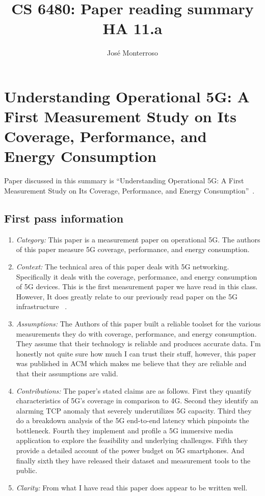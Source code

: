\documentclass[letterpaper,twocolumn,10pt]{article}
\title{CS 6480: Paper reading summary\\
HA 11.a\\}
\author{José Monterroso}
\affil{School of Computing, University of Utah}
\begin{document}
\maketitle
\section{Understanding Operational 5G: A First Measurement Study on Its Coverage, Performance, and Energy Consumption}

Paper discussed in this summary is ``Understanding Operational 5G: A First Measurement Study on Its Coverage, Performance, and Energy Consumption''~\cite{measurementstudy}.

\subsection{First pass information}
\label{sec:first}

\begin{enumerate}

\item {\it Category:} 
This paper is a measurement paper on operational 5G. The authors of this paper measure 5G coverage, 
performance, and energy consumption. 

\item {\it Context:} 
The technical area of this paper deals with 5G networking. Specifically it deals with the coverage, performance,
and energy consumption of 5G devices. This is the first measurement paper we have read in this class. However,
It does greatly relate to our previously read paper on the 5G infrastructure ~\cite{5gwhite}.

\item {\it Assumptions:}  
The Authors of this paper built a reliable toolset for the various measurements they do with coverage, performance,
and energy consumption. They assume that their technology is reliable and produces accurate data. I'm honestly 
not quite sure how much I can trust their stuff, however, this paper was published in ACM which makes me believe
that they are reliable and that their assumptions are valid. 

\item {\it Contributions:} 
The paper's stated claims are as follows. First they quantify characteristics of 5G's coverage in comparison to 4G.
Second they identify an alarming TCP anomaly that severely underutilizes 5G capacity. Third they do a breakdown
analysis of the 5G end-to-end latency which pinpoints the bottleneck. Fourth they implement and profile a 5G 
immersive media application to explore the feasibility and underlying challenges. Fifth they provide a detailed 
account of the power budget on 5G smartphones. And finally sixth they have released their dataset and measurement
tools to the public. 

\item {\it Clarity:} 
From what I have read this paper does appear to be written well. 

\end{enumerate}
\end{document}
